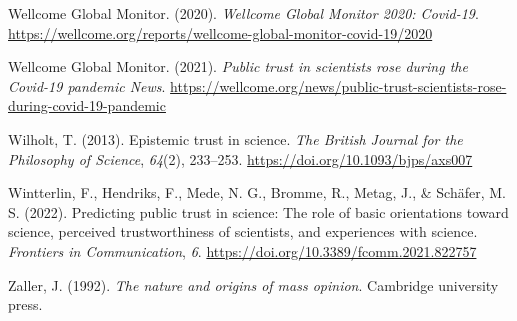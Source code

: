 \documentclass[
  jou,
  floatsintext,
  longtable,
  nolmodern,
  notxfonts,
  notimes,
  colorlinks=true,linkcolor=blue,citecolor=blue,urlcolor=blue]{apa7}
\newlength{\cslhangindent}
\newenvironment{CSLReferences}[2] %
 {\begin{list}{}{%
  \setlength{\itemindent}{0pt}
  \setlength{\leftmargin}{0pt}
  \setlength{\parsep}{0pt}
  \ifodd #1
   \setlength{\leftmargin}{\cslhangindent}
   \setlength{\itemindent}{-1\cslhangindent}
  \fi
  \setlength{\itemsep}{#2\baselineskip}}}
 {\end{list}}
\begin{document}
\begin{CSLReferences}{1}{0}
Wellcome Global Monitor. (2020). \emph{Wellcome Global Monitor 2020:
Covid-19}.
\url{https://wellcome.org/reports/wellcome-global-monitor-covid-19/2020}

Wellcome Global Monitor. (2021). \emph{Public trust in scientists rose
during the Covid-19 pandemic \textbar{} News}.
\url{https://wellcome.org/news/public-trust-scientists-rose-during-covid-19-pandemic}

Wilholt, T. (2013). Epistemic trust in science. \emph{The British
Journal for the Philosophy of Science}, \emph{64}(2), 233--253.
\url{https://doi.org/10.1093/bjps/axs007}

Wintterlin, F., Hendriks, F., Mede, N. G., Bromme, R., Metag, J., \&
Schäfer, M. S. (2022). Predicting public trust in science: The role of
basic orientations toward science, perceived trustworthiness of
scientists, and experiences with science. \emph{Frontiers in
Communication}, \emph{6}.
\url{https://doi.org/10.3389/fcomm.2021.822757}

Zaller, J. (1992). \emph{The nature and origins of mass opinion}.
Cambridge university press.

\end{CSLReferences}
\end{document}
